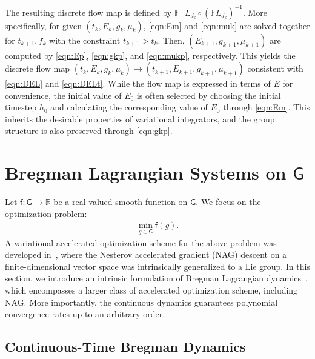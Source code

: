 \documentclass[letterpaper, 10pt, conference]{ieeeconf}
\newcommand{\G}{\ensuremath{\mathsf{G}}}
\renewcommand{\Re}{\ensuremath{\mathbb{R}}}
\newcommand{\g}{\ensuremath{\mathfrak{g}}}
\begin{document}
The resulting discrete flow map is defined by $\mathbb{F}^+L_{d_k} \circ (\mathbb{F}L_{d_k})^{-1}$. 
More specifically, for given $(t_k, E_k, g_k, \mu_k)$, \eqref{eqn:Em} and \eqref{eqn:muk} are solved together for $t_{k+1},f_k$ with the constraint $t_{k+1}>t_k$.
Then, $(E_{k+1}, g_{k+1},\mu_{k+1})$ are computed by \eqref{eqn:Ep}, \eqref{eqn:gkp}, and \eqref{eqn:mukp}, respectively.
This yields the discrete flow map $(t_k, E_k, g_k, \mu_k)\rightarrow(t_{k+1}, E_{k+1}, g_{k+1}, \mu_{k+1})$ consistent with \eqref{eqn:DEL} and \eqref{eqn:DELt}.
While the flow map is expressed in terms of $E$ for convenience, the initial value of $E_0$ is often selected by choosing the initial timestep $h_0$ and calculating the corresponding value of $E_0$ through \eqref{eqn:Em}.
This inherits the desirable properties of variational integrators, and the group structure is also preserved through \eqref{eqn:gkp}.

\section{Bregman Lagrangian Systems on $\G$}\label{sec:Breg}

\newcommand{\obj}{\mathsf{f}}

Let $\obj:\G\rightarrow\Re$ be a real-valued smooth function on $\G$.
We focus on the optimization problem:
\begin{align}
    \min_{g\in\G} \obj (g).
\end{align}
A variational accelerated optimization scheme for the above problem was developed in~\cite{tao2020variational}, where the Nesterov accelerated gradient (NAG) descent on a finite-dimensional vector space was intrinsically generalized to a Lie group. 
In this section, we introduce an intrinsic formulation of Bregman Lagrangian dynamics~\cite{wibisono2016variational}, which encompasses a larger class of accelerated optimization scheme, including NAG.
More importantly, the continuous dynamics guarantees polynomial convergence rates up to an arbitrary order.

\subsection{Continuous-Time Bregman Dynamics}
\end{document}
